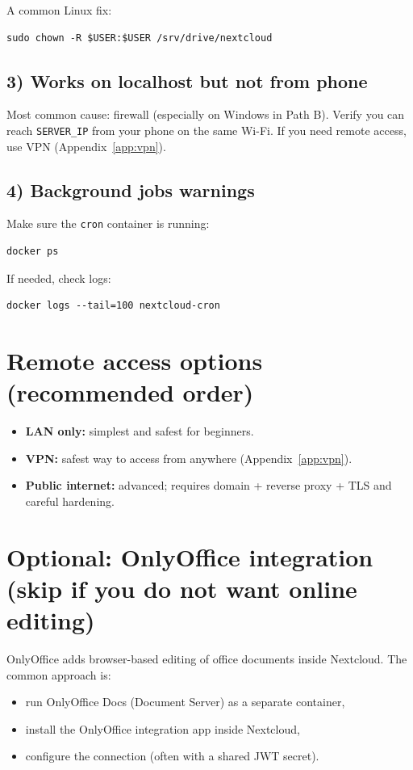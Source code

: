 A common Linux fix:

\begin{lstlisting}
sudo chown -R $USER:$USER /srv/drive/nextcloud
\end{lstlisting}

\subsection{3) Works on localhost but not from phone}
Most common cause: firewall (especially on Windows in Path B).
Verify you can reach \texttt{SERVER\_IP} from your phone on the same Wi-Fi.
If you need remote access, use VPN (Appendix~\ref{app:vpn}).

\subsection{4) Background jobs warnings}
Make sure the \texttt{cron} container is running:
\begin{lstlisting}
docker ps
\end{lstlisting}
If needed, check logs:
\begin{lstlisting}
docker logs --tail=100 nextcloud-cron
\end{lstlisting}

\section{Remote access options (recommended order)}
\begin{itemize}[leftmargin=*]
  \item \textbf{LAN only:} simplest and safest for beginners.
  \item \textbf{VPN:} safest way to access from anywhere (Appendix~\ref{app:vpn}).
  \item \textbf{Public internet:} advanced; requires domain + reverse proxy + TLS and careful hardening.
\end{itemize}


\section{Optional: OnlyOffice integration (skip if you do not want online editing)}
\label{sec:nc_onlyoffice}
OnlyOffice adds browser-based editing of office documents inside Nextcloud.
The common approach is:
\begin{itemize}[leftmargin=*]
  \item run OnlyOffice Docs (Document Server) as a separate container,
  \item install the OnlyOffice integration app inside Nextcloud,
  \item configure the connection (often with a shared JWT secret).
\end{itemize}

